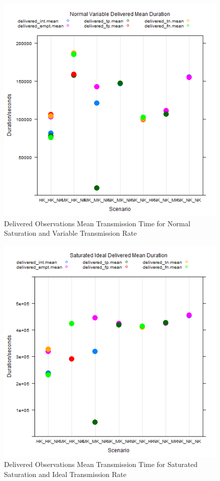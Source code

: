 	\begin{figure}[H]
	\centering
	\includegraphics[width=\textwidth]{Chap7/figures/plots/normal_variable/delivered_mean.png}
	\caption{Delivered Observations Mean Transmission Time for Normal Saturation and Variable Transmission Rate}
	\label{fig:sim:res:norm:variable:delmean}
	\end{figure}

	\begin{figure}[H]
	\centering
	\includegraphics[width=\textwidth]{Chap7/figures/plots/saturated_ideal/delivered_mean.png}
	\caption{Delivered Observations Mean Transmission Time for Saturated Saturation and Ideal Transmission Rate}
	\label{fig:sim:res:sat:ideal:delmean}
	\end{figure}


